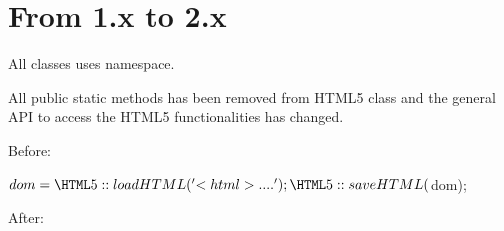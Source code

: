 \chapter{From 1.\+x to 2.\+x }
\hypertarget{md__c_1_2xampp_2htdocs_2_g_pagos_ayuntamiento_2vendor_2masterminds_2html5_2_u_p_g_r_a_d_i_n_g}{}\label{md__c_1_2xampp_2htdocs_2_g_pagos_ayuntamiento_2vendor_2masterminds_2html5_2_u_p_g_r_a_d_i_n_g}

\begin{DoxyItemize}
\item All classes uses {\ttfamily {}} namespace.
\item All public static methods has been removed from {\ttfamily HTML5} class and the general API to access the HTML5 functionalities has changed.

Before\+: \begin{DoxyVerb}$dom = \HTML5::loadHTML('<html>....');
\HTML5::saveHTML($dom);
\end{DoxyVerb}


After\+: 
 
\end{DoxyItemize}